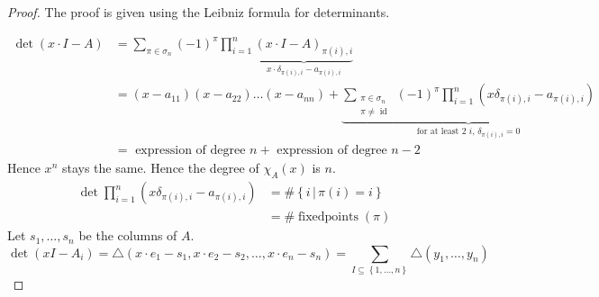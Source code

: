 \documentclass{article}
\newcommand{\set}[1]{\left\{#1\right\}}
\newcommand{\setdef}[2]{\left\{\left.#1\,\right|\,#2\right\}}
\begin{document}
\begin{proof}
  The proof is given using the Leibniz formula for determinants.

  \begin{align*}
    \det(x \cdot I - A) &= \sum_{\pi \in \sigma_n} (-1)^\pi \prod_{i=1}^n \underbrace{(x \cdot I - A)_{\pi(i),i}}_{x \cdot \delta_{\pi(i),i} - a_{\pi(i),i}} \\
      &= (x - a_{11})(x - a_{22}) \dots (x - a_{nn}) +
        \underbrace{
          \sum_{\substack{\pi \in \sigma_n \\ \pi \neq \operatorname{id}}}
          (-1)^\pi \prod_{i=1}^n
          \left(x \delta_{\pi(i),i} - a_{\pi(i),i}\right)
        }_{\text{for at least 2 $i$, $\delta_{\pi(i),i} = 0$}} \\
      &= \text{ expression of degree } n + \text{ expression of degree } n -2
  \end{align*}
  Hence $x^n$ stays the same. Hence the degree of $\chi_A(x)$ is $n$.
  \begin{align*}
    \det{\prod_{i=1}^n (x \delta_{\pi(i),i} - a_{\pi(i),i})} &= \#\setdef{i}{\pi(i) = i} \\
      &= \#\operatorname{fixedpoints}(\pi)
  \end{align*}
  Let $s_1, \dots, s_n$ be the columns of $A$.
  \[ \det(xI - A_i) = \triangle(x\cdot e_1 - s_1, x \cdot e_2 - s_2, \dots, x \cdot e_n - s_n) = \sum_{I \subseteq \set{1, \dots, n}} \triangle(y_1, \dots, y_n) \]


\end{proof}
\end{document}
